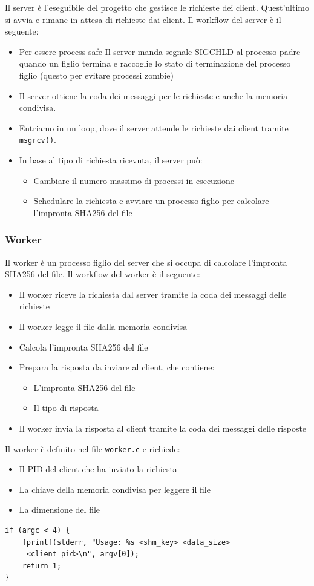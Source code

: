 \documentclass[a4paper]{article}
\begin{document}
Il server è l'eseguibile del progetto che gestisce le richieste dei client.
Quest'ultimo si avvia e rimane in attesa di richieste dai client.
Il workflow del server è il seguente:
\begin{itemize}
    \item Per essere process-safe Il server manda segnale SIGCHLD al processo padre quando un figlio termina e
    raccoglie lo stato di terminazione del processo figlio
    (questo per evitare processi zombie)
    \item Il server ottiene la coda dei messaggi per le 
    richieste e anche la memoria condivisa.
    \item Entriamo in un loop, dove il server attende le richieste dai client tramite \texttt{msgrcv()}.
    \item In base al tipo di richiesta ricevuta, il server può:
    \begin{itemize}
        \item Cambiare il numero massimo di processi in esecuzione
        \item Schedulare la richiesta e avviare un processo figlio per calcolare l'impronta SHA256 del file
    \end{itemize}
\end{itemize}

\subsubsection{Worker}

Il worker è un processo figlio del server che si occupa di calcolare l'impronta SHA256 del file.
Il workflow del worker è il seguente:
\begin{itemize}
    \item Il worker riceve la richiesta dal server tramite la coda dei messaggi delle richieste
    \item Il worker legge il file dalla memoria condivisa
    \item Calcola l'impronta SHA256 del file 
    \item Prepara la risposta da inviare al client, che contiene:
    \begin{itemize}
        \item L'impronta SHA256 del file
        \item Il tipo di risposta
    \end{itemize}
    \item Il worker invia la risposta al client tramite la coda dei messaggi delle risposte
\end{itemize}
\noindent
Il worker è definito nel file \texttt{worker.c} e richiede:
\begin{itemize}
    \item Il PID del client che ha inviato la richiesta
    \item La chiave della memoria condivisa per leggere il file
    \item La dimensione del file
\end{itemize}
\begin{verbatim}
if (argc < 4) {
    fprintf(stderr, "Usage: %s <shm_key> <data_size>
     <client_pid>\n", argv[0]);
    return 1;
}
\end{verbatim}
\end{document}
